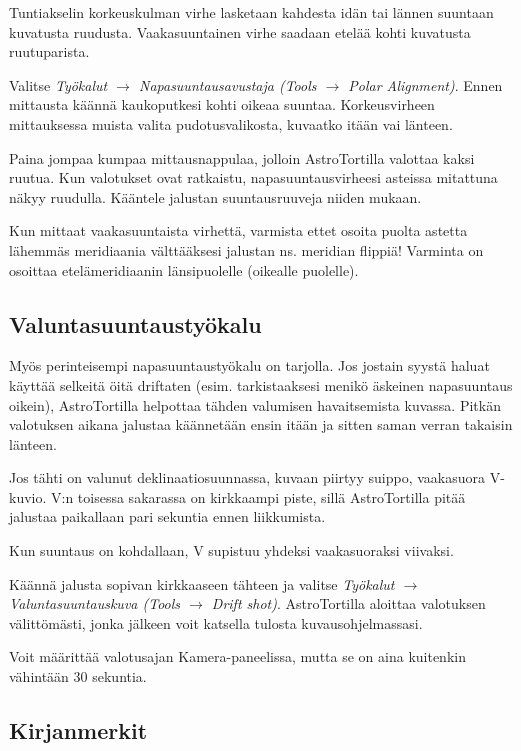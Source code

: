 \documentclass{article}
\begin{document}
Tuntiakselin korkeuskulman virhe lasketaan kahdesta idän tai lännen suuntaan kuvatusta ruudusta.
Vaakasuuntainen virhe saadaan etelää kohti kuvatusta ruutuparista.

Valitse \emph{Työkalut $\rightarrow$ Napasuuntausavustaja
(Tools $\rightarrow$ Polar Alignment)}. Ennen mittausta käännä kaukoputkesi 
kohti oikeaa suuntaa.  Korkeusvirheen mittauksessa muista valita pudotusvalikosta, kuvaatko itään vai länteen.

Paina jompaa kumpaa mittausnappulaa, jolloin AstroTortilla
valottaa kaksi ruutua. Kun valotukset ovat ratkaistu, napasuuntausvirheesi
asteissa mitattuna näkyy ruudulla. Kääntele jalustan suuntausruuveja niiden mukaan.

Kun mittaat vaakasuuntaista virhettä, varmista ettet osoita puolta astetta
lähemmäs meridiaania välttääksesi jalustan ns. meridian flippiä! Varminta on
osoittaa etelämeridiaanin länsipuolelle (oikealle puolelle).



\subsection{Valuntasuuntaustyökalu}

Myös perinteisempi napasuuntaustyökalu on tarjolla. Jos jostain syystä haluat 
käyttää selkeitä öitä driftaten (esim. tarkistaaksesi menikö äskeinen napasuuntaus oikein),
AstroTortilla helpottaa tähden valumisen havaitsemista kuvassa. Pitkän valotuksen aikana jalustaa käännetään ensin itään ja sitten saman verran takaisin länteen.

Jos tähti on valunut deklinaatiosuunnassa, kuvaan piirtyy suippo,
vaakasuora V-kuvio. V:n toisessa sakarassa on kirkkaampi piste, 
sillä AstroTortilla pitää jalustaa paikallaan pari sekuntia ennen liikkumista.

Kun suuntaus on kohdallaan, V supistuu yhdeksi vaakasuoraksi viivaksi.

Käännä jalusta sopivan kirkkaaseen tähteen ja valitse
\emph{Työkalut $\rightarrow$
Valuntasuuntauskuva (Tools $\rightarrow$ Drift shot)}. AstroTortilla aloittaa valotuksen välittömästi, jonka jälkeen voit katsella tulosta
kuvausohjelmassasi.

Voit määrittää valotusajan Kamera-paneelissa, mutta se on aina kuitenkin vähintään 30 sekuntia.

\subsection{Kirjanmerkit}
\end{document}
